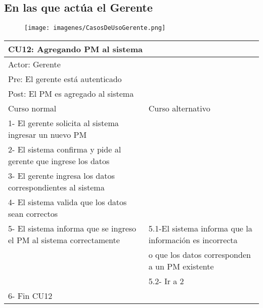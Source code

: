 \subsection{En las que actúa el Gerente}

\begin{figure}[H]
    \texttt{[image: imagenes/CasosDeUsoGerente.png]}
\end{figure}

\begin{table}[H]
  \begin{adjustbox}{max width = \textwidth}
  \begin{tabular}{|l|l|}
    \hline
    \multicolumn{2}{|l|}{CU12: Agregando PM al sistema} \\\hline
    \multicolumn{2}{|l|}{Actor: Gerente} \\\hline
    \multicolumn{2}{|l|}{Pre: El gerente está autenticado} \\\hline
    \multicolumn{2}{|l|}{Post: El PM es agregado al sistema} \\\hline
     Curso normal & Curso alternativo\\ \hline
	 1- El gerente solicita al sistema ingresar un nuevo PM & \\ \hline
     2- El sistema confirma y pide al gerente que ingrese los datos & \\ \hline
     3- El gerente ingresa los datos correspondientes al sistema & \\ \hline
     4- El sistema valida que los datos sean correctos & \\ \hline
     5- El sistema informa que se ingreso el PM al sistema correctamente & 5.1-El sistema informa que la información es incorrecta \\ & o que los datos corresponden a un PM existente  \\ & 5.2- Ir a 2 \\ \hline
     6- Fin CU12 & \\ \hline
  \end{tabular}
  \end{adjustbox}
\end{table}



